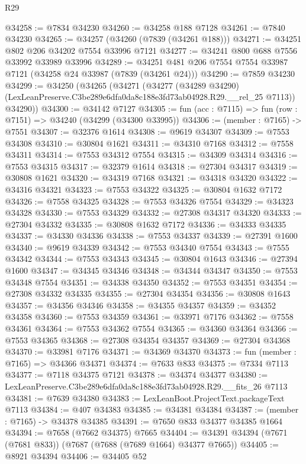\begin{lexlean}{R29}
\begin{coremodule}
@34258 := @7834 @34230
@34260 := @34258 @188 @7128
@34261 := @7840 @34230
@34265 := @34257 (@34260 (@7839 (@34261 @188)))
@34271 := @34251 @802 @206 @34202 @7554 @33996 @7121
@34277 := @34241 @800 @688 @7556 @33992 @33989 @33996
@34289 := @34251 @481 @206 @7554 @7554 @33987 @7121 (@34258 @24 @33987 (@7839 (@34261 @24)))
@34290 := @7859 @34230
@34299 := @34250
    (@34265
      (@34271
        (@34277
          (@34289 @34290)
          (LexLeanPreserve.C3be289e6dfa0da8c188e3fd73ab04928.R29.__rel_25 @7113))
        @34290))
@34300 := @34142 @7127
@34305 := fun (acc : @7115) => fun (row : @7151) => @34240 (@34299 (@34300 @33995))
@34306 := (member : @7165) -> @7551
@34307 := @32376 @1614
@34308 := @9619 @34307
@34309 := @7553 @34308
@34310 := @30804 @1621
@34311 := @34310 @7168
@34312 := @7558 @34311
@34314 := @7553 @34312 @7554
@34315 := @34309 @34314
@34316 := @7553 @34315
@34317 := @32379 @1614
@34318 := @27304 @34317
@34319 := @30808 @1621
@34320 := @34319 @7168
@34321 := @34318 @34320
@34322 := @34316 @34321
@34323 := @7553 @34322
@34325 := @30804 @1632 @7172
@34326 := @7558 @34325
@34328 := @7553 @34326 @7554
@34329 := @34323 @34328
@34330 := @7553 @34329
@34332 := @27308 @34317 @34320
@34333 := @27304 @34332
@34335 := @30808 @1632 @7172
@34336 := @34333 @34335
@34337 := @34330 @34336
@34338 := @7553 @34337
@34339 := @27391 @1600
@34340 := @9619 @34339
@34342 := @7553 @34340 @7554
@34343 := @7555 @34342
@34344 := @7553 @34343
@34345 := @30804 @1643
@34346 := @27394 @1600
@34347 := @34345 @34346
@34348 := @34344 @34347
@34350 := @7553 @34348 @7554
@34351 := @34338 @34350
@34352 := @7553 @34351
@34354 := @27308 @34332 @34335
@34355 := @27304 @34354
@34356 := @30808 @1643
@34357 := @34356 @34346
@34358 := @34355 @34357
@34359 := @34352 @34358
@34360 := @7553 @34359
@34361 := @33971 @7176
@34362 := @7558 @34361
@34364 := @7553 @34362 @7554
@34365 := @34360 @34364
@34366 := @7553 @34365
@34368 := @27308 @34354 @34357
@34369 := @27304 @34368
@34370 := @33981 @7176
@34371 := @34369 @34370
@34373 := fun (member : @7165) => @34366 @34371
@34374 := @7633 @833
@34375 := @7334 @7113
@34377 := @7118 @34375 @7121
@34378 := @34374 @34377
@34380 := LexLeanPreserve.C3be289e6dfa0da8c188e3fd73ab04928.R29.__fits_26 @7113
@34381 := @7639 @34380
@34383 := LexLeanBoot.ProjectText.packageText @7113
@34384 := @407 @34383
@34385 := @34381 @34384
@34387 := (member : @7165) -> @34378 @34385
@34391 := @7650 @833 @34377 @34385 @1664
@34394 := @7658 (@7662 @34375) @7665
@34404 := @34391 @34394 (@7671 (@7681 @833)) (@7687 (@7688 (@7689 @1664) @34377 @7665))
@34405 := @8921 @34394
@34406 := @34405 @52

\end{coremodule}
\end{lexlean}
